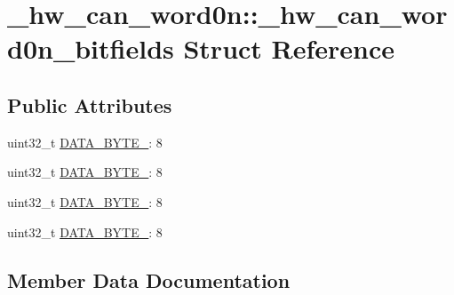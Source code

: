 \hypertarget{struct__hw__can__word0n_1_1__hw__can__word0n__bitfields}{}\section{\+\_\+hw\+\_\+can\+\_\+word0n\+:\+:\+\_\+hw\+\_\+can\+\_\+word0n\+\_\+bitfields Struct Reference}
\label{struct__hw__can__word0n_1_1__hw__can__word0n__bitfields}
\subsection*{Public Attributes}
\begin{DoxyCompactItemize}
\item 
uint32\+\_\+t \hyperlink{struct__hw__can__word0n_1_1__hw__can__word0n__bitfields_aeb0a1f388379469f4cdf88758c406421}{D\+A\+T\+A\+\_\+\+B\+Y\+T\+E\+\_}\+: 8
\item 
uint32\+\_\+t \hyperlink{struct__hw__can__word0n_1_1__hw__can__word0n__bitfields_ab0335597c49a2dec00d7af030d668eda}{D\+A\+T\+A\+\_\+\+B\+Y\+T\+E\+\_}\+: 8
\item 
uint32\+\_\+t \hyperlink{struct__hw__can__word0n_1_1__hw__can__word0n__bitfields_a1e6f88a511009a0fb1879f55eb04d472}{D\+A\+T\+A\+\_\+\+B\+Y\+T\+E\+\_}\+: 8
\item 
uint32\+\_\+t \hyperlink{struct__hw__can__word0n_1_1__hw__can__word0n__bitfields_a36a530af3ea56cadb66206340ea11887}{D\+A\+T\+A\+\_\+\+B\+Y\+T\+E\+\_}\+: 8
\end{DoxyCompactItemize}


\subsection{Member Data Documentation}
